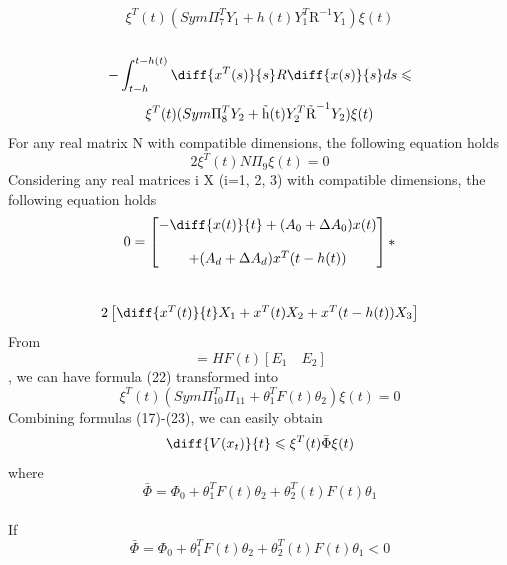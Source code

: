 \documentclass[journal]{IEEEtran}
\begin{document}
\\
\begin{equation}
\xi ^T (t)(Sym{\Pi^{T}_{7}Y_1} + h(t)Y^{T}_{1}\text{\~{R}}^{-1}Y_1)\xi (t)
\end{equation}
\\
\begin{equation}
-\int^{t-h(t)}_{t-h}\diff{x^T(s)}{s}R\diff{x(s)}{s}ds \leqslant 
\end{equation}
\begin{equation}
\xi ^T (t)(Sym{\Pi^{T}_{8}Y_2} +\text{\~{h(t)}}Y^{T}_{2}\text{\~{R}}^{-1}Y_2)\xi (t)
\end{equation}
For any real matrix N with compatible dimensions, the following equation holds 
\begin{equation}
2\xi ^T (t)N\Pi_9\xi (t) = 0
\end{equation}
Considering any real matrices i X (i=1, 2, 3) with compatible dimensions, the following equation holds 
\begin{equation}
0 = 
\begin{bmatrix}
-\diff{x(t)}{t} + (A_0 + \Delta{A_0})x(t) \\ \\
+(A_d + \Delta{A_d})x^T(t - h(t)) 
\end{bmatrix}
*
\end{equation}
\\
\begin{equation}
2
\begin{bmatrix}
\diff{x^T(t)}{t}X_1 + x^T(t)X_2 + x^T(t - h(t))X_3
\end{bmatrix}
\end{equation}
From
\begin{equation}
[\Delta{A_0} \quad \Delta{A_d}] = HF(t)[E_1 \quad E_2]
\end{equation} 
, we can have formula (22) transformed into
\begin{equation}
\xi ^T (t)(Sym{\Pi^{T}_{10}\Pi_{11} + \theta^{T}_{1}F(t)\theta_2})\xi (t) = 0
\end{equation}
Combining formulas (17)-(23), we can easily obtain  
\begin{equation}
\diff{V(x_t)}{t}  \leqslant \xi ^T (t)\bar{\Phi}\xi(t)
\end{equation}
where
\begin{equation}
\bar{\Phi} = \Phi_0 + \theta^{T}_{1}F(t)\theta_2   +   \theta^{T}_{2}(t)F(t)\theta_1
\end{equation}
\\
If
\begin{equation}
\bar{\Phi} = \Phi_0 + \theta^{T}_{1}F(t)\theta_2   +   \theta^{T}_{2}(t)F(t)\theta_1   < 0
\end{equation}
\end{document}
